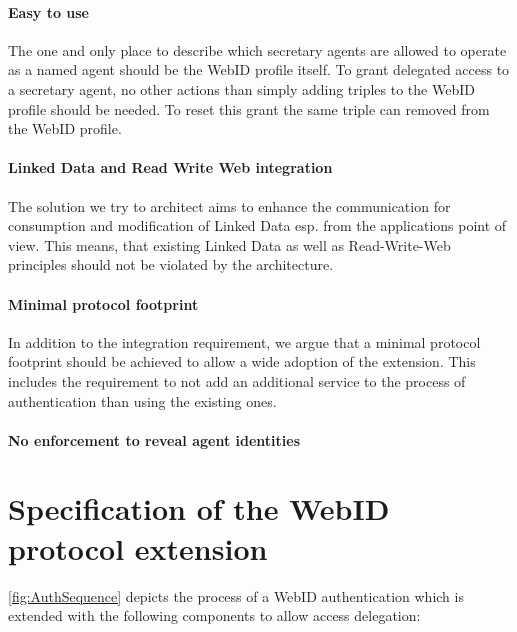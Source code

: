 \documentclass[a4paper]{llncs}
\begin{document}
\paragraph{Easy to use}
The one and only place to describe which secretary agents are allowed to operate as a named agent should be the WebID profile itself.
To grant delegated access to a secretary agent, no other actions than simply adding triples to the WebID profile should be needed.
To reset this grant the same triple can removed from the WebID profile. 

\paragraph{Linked Data and Read Write Web integration}

The solution we try to architect aims to enhance the communication for consumption and modification of Linked Data esp. from the applications point of view.
This means, that existing Linked Data as well as Read-Write-Web principles should not be violated by the architecture.

\paragraph{Minimal protocol footprint}

In addition to the integration requirement, we argue that a minimal protocol footprint should be achieved to allow a wide adoption of the extension.
This includes the requirement to not add an additional service to the process of authentication than using the existing ones.

\paragraph{No enforcement to reveal agent identities}
 

\section{Specification of the WebID protocol extension}\label{sec:spec}

\autoref{fig:AuthSequence} depicts the process of a WebID authentication which is extended with the following components to allow access delegation:
\end{document}
